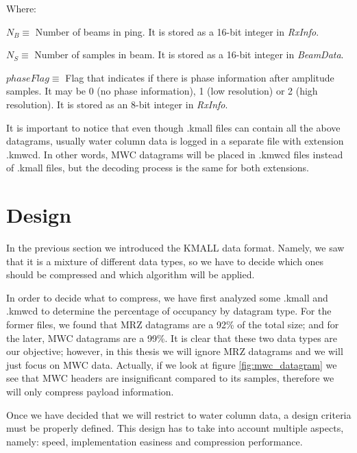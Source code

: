 Where:
\begin{description}
	\item $N_B \equiv$ Number of beams in ping. It is stored as a 16-bit integer in \textit{RxInfo}.
	\item $N_S \equiv$ Number of samples in beam. It is stored as a 16-bit integer in \textit{BeamData}.
	\item $phaseFlag \equiv$ Flag that indicates if there is phase information after amplitude samples. It may be 0 (no phase information), 1 (low resolution) or 2 (high resolution). It is stored as an 8-bit integer in \textit{RxInfo}.
\end{description}

It is important to notice that even though .kmall files can contain all the above datagrams, usually water column data is logged in a separate file with extension .kmwcd. In other words, MWC datagrams will be placed in .kmwcd files instead of .kmall files, but the decoding process is the same for both extensions.

\section{Design}

In the previous section we introduced the KMALL data format. Namely, we saw that it is a mixture of different data types, so we have to decide which ones should be compressed and which algorithm will be applied.

In order to decide what to compress, we have first analyzed some .kmall and .kmwcd to determine the percentage of occupancy by datagram type. For the former files, we found that MRZ datagrams are a 92\% of the total size; and for the later, MWC datagrams are a 99\%. It is clear that these two data types are our objective; however, in this thesis we will ignore MRZ datagrams and we will just focus on MWC data. Actually, if we look at figure \ref{fig:mwc_datagram} we see that MWC headers are insignificant compared to its samples, therefore we will only compress payload information.

Once we have decided that we will restrict to water column data, a design criteria must be properly defined. This design has to take into account multiple aspects, namely: speed, implementation easiness and compression performance.

